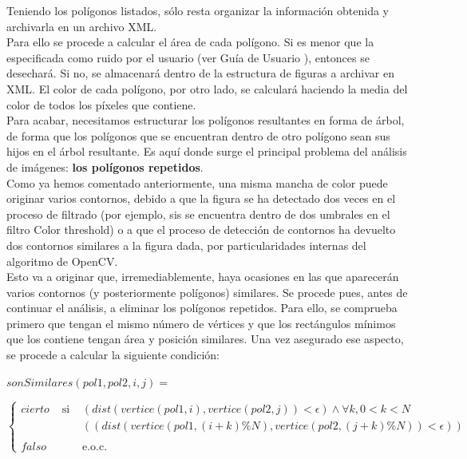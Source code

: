 {	Teniendo los polígonos listados, sólo resta organizar la información obtenida y archivarla en un archivo XML.\\
	
	Para ello se procede a calcular el área de cada polígono. Si es menor que la especificada como ruido por el usuario (ver Guía de Usuario  ), entonces se desechará. Si no, se almacenará dentro de la estructura de figuras a archivar en XML. El color de cada polígono, por otro lado, se calculará haciendo la media del color de todos los píxeles que contiene.\\
	
	Para acabar, necesitamos estructurar los polígonos resultantes en forma de árbol, de forma que los polígonos que se encuentran dentro de otro polígono sean sus hijos en el árbol resultante. Es aquí donde surge el principal problema del análisis de imágenes: \textbf{los polígonos repetidos}.\\
	
	Como ya hemos comentado anteriormente, una misma mancha de color puede originar varios contornos, debido a que la figura se ha detectado dos veces en el proceso de filtrado (por ejemplo, sis se encuentra dentro de dos umbrales en el filtro Color threshold) o a que el proceso de detección de contornos ha devuelto dos contornos similares a la figura dada, por particularidades internas del algoritmo de OpenCV.\\
	
	Esto va a originar que, irremediablemente, haya ocasiones en las que aparecerán varios contornos (y posteriormente polígonos) similares. Se procede pues, antes de continuar el análisis, a eliminar los polígonos repetidos. Para ello, se comprueba primero que tengan el mismo número de vértices y que los rectángulos mínimos que los contiene tengan área y posición similares. Una vez asegurado ese aspecto, se procede a calcular la siguiente condición:
	
	\begin{center}
		$sonSimilares(pol1,pol2,i,j) =$
	\end{center}
	\begin{center}
		
		$\left\{
		\begin{array}{ccc}
		cierto 	& \text{ si } & (dist(vertice(pol1,i), vertice(pol2,j)) < \epsilon)\wedge \forall k, 0 < k < N \\
				&             &  ((dist(vertice(pol1,(i + k) \%N), vertice(pol2,(j + k)\%N)) < \epsilon))\\
		 & & \\
		falso 	& 	          & \text{e.o.c.}
		\end{array}\right.$
		\end{center}
	
}
